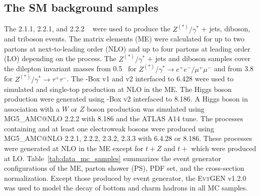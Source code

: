 \subsection{The SM background samples}
\label{subsec:data_sm_bkg_samples}
The {\SHERPA} 2.1.1, 2.2.1, and 2.2.2 ~\cite{Gleisberg:2008ta} were used to produce the $Z^{(*)}/\gamma^{*}$ + jets, diboson, and triboson events.
The matrix elements (ME) were calculated for up to two partons at next-to-leading order (NLO) and up to four partons at leading order (LO) depending on the process.
The $Z^{(*)}/\gamma^{*}$ + jets and diboson samples cover the dilepton invariant masses from 0.5~{\GeV} for $Z^{(*)}/\gamma^{*} \to e^{+}e^{-}/\mu^{+}\mu^{-}$ and from 3.8~{\GeV} for $Z^{(*)}/\gamma^{*} \to \tau^{+}\tau^{-}$.
The {\POWHEG}-Box v1 and v2 interfaced to {\PYTHIA} 6.428 were used to simulated \ttbar and single-top production at NLO in the ME.
The Higgs boson production were generated using {\POWHEG}-Box v2 interfaced to {\PYTHIA} 8.186.
A Higgs boson in association with a $W$ or $Z$ boson production was simulated using MG5\_{\scriptsize A}MC@NLO 2.2.2 with {\PYTHIA} 8.186 and the ATLAS A14 tune.
The processes containing \ttbar and at least one electroweak bosons were produced using MG5\_{\scriptsize A}MC@NLO 2.2.1, 2.2.2, 2.3.2, 2.3.3 with {\PYTHIA} 6.4.28 or 8.186.
These processes were generated at NLO in the ME except for $t + Z$ and $t +$ \ttbar which were produced at LO.
Table~\ref{tab:data_mc_samples} summarizes the event generator configurations of the ME, parton shower (PS), PDF set, and the cross-section normalization.
Except those produced by {\SHERPA} event generator, the \textsc{EvtGEN}\xspace v1.2.0~\cite{Lange:2001uf} was used to model the decay of bottom and charm hadrons in all MC samples.

